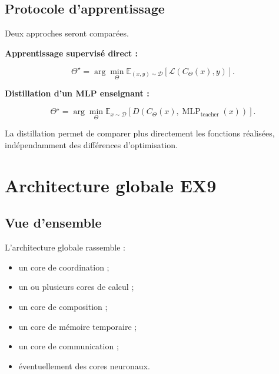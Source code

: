 \documentclass[11pt,a4paper]{article}
\begin{document}
\subsection{Protocole d'apprentissage}

Deux approches seront comparées.

\textbf{Apprentissage supervisé direct :}

\[
\Theta^\star
=
\arg\min_{\Theta}
\mathbb{E}_{(x,y)\sim\mathcal{D}}
\left[
\mathcal{L}(C_{\Theta}(x),y)
\right].
\]

\textbf{Distillation d'un MLP enseignant :}

\[
\Theta^\star
=
\arg\min_{\Theta}
\mathbb{E}_{x\sim\mathcal{D}}
\left[
D\left(
C_{\Theta}(x),
\operatorname{MLP}_{\mathrm{teacher}}(x)
\right)
\right].
\]

La distillation permet de comparer plus directement les fonctions
réalisées, indépendamment des différences d'optimisation.

\section{Architecture globale EX9}

\subsection{Vue d'ensemble}

L'architecture globale rassemble :
\begin{itemize}
  \item un core de coordination ;
  \item un ou plusieurs cores de calcul ;
  \item un core de composition ;
  \item un core de mémoire temporaire ;
  \item un core de communication ;
  \item éventuellement des cores neuronaux.
\end{itemize}
\end{document}
